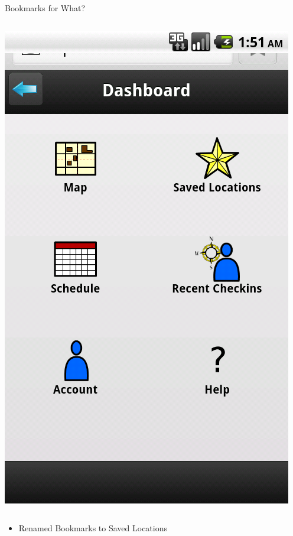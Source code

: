 \documentclass{beamer}
\begin{document}
\begin{frame}{Bookmarks for What?}
\begin{columns}[c]
        \center\includegraphics[height=0.5 \textheight]{pre-heuristic/dashboard.png}
    \end{columns}
    \begin{itemize}
        \item Renamed Bookmarks to Saved Locations
    \end{itemize}
\end{frame}
\end{document}
